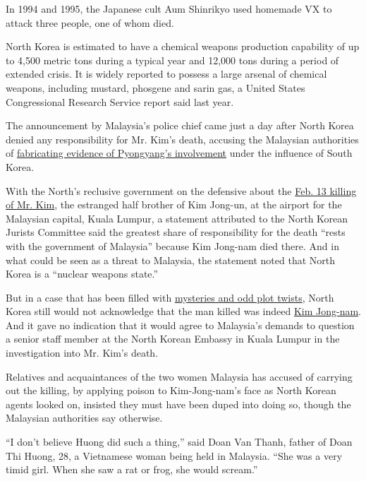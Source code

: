 In 1994 and 1995, the Japanese cult Aum Shinrikyo used homemade VX to
attack three people, one of whom died.

North Korea is estimated to have a chemical weapons production
capability of up to 4,500 metric tons during a typical year and 12,000
tons during a period of extended crisis. It is widely reported to
possess a large arsenal of chemical weapons, including mustard, phosgene
and sarin gas, a United States Congressional Research Service report
said last year.

The announcement by Malaysia's police chief came just a day after North
Korea denied any responsibility for Mr. Kim's death, accusing the
Malaysian authorities of
\href{https://www.nytimes3xbfgragh.onion/2017/02/23/world/asia/kim-jong-nam-assassination-north-korea-malaysia.html}{fabricating
evidence of Pyongyang's involvement} under the influence of South Korea.

With the North's reclusive government on the defensive about the
\href{https://www.nytimes3xbfgragh.onion/2017/02/14/world/asia/kim-jong-un-brother-killed-malaysia.html}{Feb.
13 killing of Mr. Kim}, the estranged half brother of Kim Jong-un, at
the airport for the Malaysian capital, Kuala Lumpur, a statement
attributed to the North Korean Jurists Committee said the greatest share
of responsibility for the death ``rests with the government of
Malaysia'' because Kim Jong-nam died there. And in what could be seen as
a threat to Malaysia, the statement noted that North Korea is a
``nuclear weapons state.''

But in a case that has been filled with
\href{https://www.nytimes3xbfgragh.onion/2017/02/22/world/asia/kim-jong-nam-assassination-korea-malaysia.html}{mysteries
and odd plot twists}, North Korea still would not acknowledge that the
man killed was indeed
\href{https://www.nytimes3xbfgragh.onion/2017/02/15/world/asia/kim-jong-nam-assassination-north-korea.html}{Kim
Jong-nam}. And it gave no indication that it would agree to Malaysia's
demands to question a senior staff member at the North Korean Embassy in
Kuala Lumpur in the investigation into Mr. Kim's death.

Relatives and acquaintances of the two women Malaysia has accused of
carrying out the killing, by applying poison to Kim-Jong-nam's face as
North Korean agents looked on, insisted they must have been duped into
doing so, though the Malaysian authorities say otherwise.

``I don't believe Huong did such a thing,'' said Doan Van Thanh, father
of Doan Thi Huong, 28, a Vietnamese woman being held in Malaysia. ``She
was a very timid girl. When she saw a rat or frog, she would scream.''

